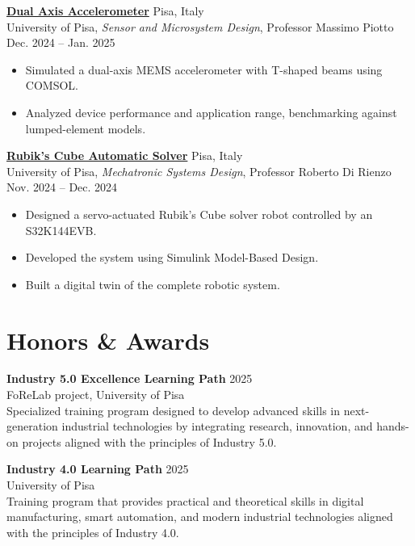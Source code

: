 \documentclass[11pt]{article}
\newcommand{\entry}[4]{{{\textbf{#1}}} \hfill #3 \\ #2 \hfill #4}
\begin{document}
	\entry{\href{https://github.com/leonardobove/dual_axis_accelerometer}{Dual Axis Accelerometer}}{University of Pisa, \textit{Sensor and Microsystem Design}, Professor Massimo Piotto}{Pisa, Italy}{Dec. 2024 -- Jan. 2025}
	\begin{itemize}[noitemsep,leftmargin=10.0mm,rightmargin=0mm,topsep=6pt]
		\item Simulated a dual-axis MEMS accelerometer with T-shaped beams using COMSOL.
		\item Analyzed device performance and application range, benchmarking against lumped-element models.
	\end{itemize}
	
	
	\entry{\href{https://github.com/leonardobove/rubiks_cube_automatic_solver/tree/main}{Rubik's Cube Automatic Solver}}{University of Pisa, \textit{Mechatronic Systems Design}, Professor Roberto Di Rienzo}{Pisa, Italy}{Nov. 2024 -- Dec. 2024}
	\begin{itemize}[noitemsep,leftmargin=10.0mm,rightmargin=0mm,topsep=6pt]
		\item Designed a servo-actuated Rubik's Cube solver robot controlled by an S32K144EVB.
		\item Developed the system using Simulink Model-Based Design.
		\item Built a digital twin of the complete robotic system.
	\end{itemize}
	
	
	\section{Honors \& Awards}
	
	\entry{Industry 5.0 Excellence Learning Path}{FoReLab project, University of Pisa}{2025}{} \\
	Specialized training program designed to develop advanced skills in next-generation industrial technologies by integrating research, innovation, and hands-on projects aligned with the principles of Industry 5.0.
	
	\smallskip
	\entry{Industry 4.0 Learning Path}{University of Pisa}{2025}{} \\
	Training program that provides practical and theoretical skills in digital manufacturing, smart automation, and modern industrial technologies aligned with the principles of Industry 4.0.
	
\end{document}
